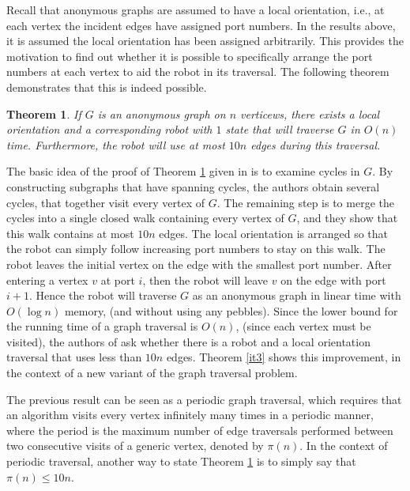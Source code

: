 \documentclass[12pt,letterpaper,oneside]{book}
\newtheorem{theorem}{Theorem}[section]
\begin{document}
Recall that anonymous graphs are assumed to have a local orientation, i.e., at each vertex 
the incident edges have assigned port numbers.  
In the results above, it is assumed the local orientation has been assigned arbitrarily.  
This provides the motivation to find out whether it is possible to specifically arrange 
the port numbers at each vertex to aid the robot in its traversal.  The following 
theorem demonstrates that this is indeed possible.  


\begin{theorem}\label{it2}
\emph{\cite{DJSS}} If $G$ is an anonymous graph on $n$ verticews, there exists a local orientation and a corresponding robot with $1$ state that 
will traverse $G$ in $O(n)$ time.  Furthermore, the robot will use at most $10n$ edges during this traversal.  
\end{theorem}

The basic idea of the proof of Theorem \ref{it2} given in \cite{DJSS} is to examine cycles in $G$.  
By constructing subgraphs that have spanning cycles, the authors obtain several cycles, that together visit 
every vertex of $G$.  The remaining step is to merge the cycles into a single closed walk containing every vertex of $G$, and they show that 
this walk contains at most $10n$ edges.  The local orientation 
is arranged so that the robot can simply follow increasing port numbers to stay on this walk.  
The robot leaves the initial vertex on the edge with the smallest port number.  
After entering a vertex $v$ at port $i$, then the robot will 
leave $v$ on the edge with port $i+1$.  
Hence the robot will traverse $G$ as an anonymous graph in linear time with 
$O(\log n)$ memory, (and without using any pebbles).  Since the lower bound for the running time of a graph traversal is 
$O(n)$, (since each vertex must be visited), the authors of \cite{DJSS} ask whether there is a robot 
and a local orientation  
traversal that uses less than $10n$ edges.  
Theorem \ref{it3} shows this improvement, in the context of a new variant of the graph traversal problem.  


The previous result can be seen as a periodic graph traversal, which 
requires that an algorithm visits every vertex 
infinitely many times in a periodic manner, where the period is the maximum number of edge traversals 
performed between two consecutive visits of a generic 
vertex, denoted by $\pi(n)$.  In the context of periodic traversal, another way to state Theorem \ref{it2} is to simply 
say that $\pi(n)\le 10n$.  
\end{document}

